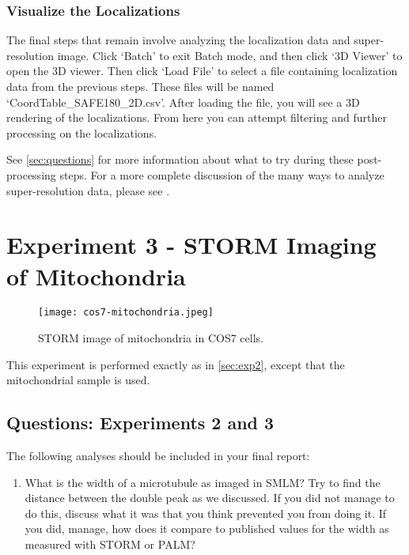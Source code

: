 \documentclass[10pt,a4paper,oneside]{book}
\begin{document}
\subsubsection{Visualize the Localizations}

The final steps that remain involve analyzing the localization data and super-resolution image. Click `Batch' to exit Batch mode, and then click `3D Viewer' to open the 3D viewer. Then click `Load File' to select a file containing localization data from the previous steps. These files will be named `CoordTable\_SAFE180\_2D.csv'. After loading the file, you will see a 3D rendering of the localizations. From here you can attempt filtering and further processing on the localizations.

See \autoref{sec:questions} for more information about what to try during these post-processing steps. For a more complete discussion of the many ways to analyze super-resolution data, please see \cite{martens-frontiersinbioinformatics-2022}.

\section{Experiment 3 - STORM Imaging of Mitochondria}\label{sec:exp3}

\begin{figure}[ht]
    \centering
    \texttt{[image: cos7-mitochondria.jpeg]}
    \caption{STORM image of mitochondria in COS7 cells.}
    \label{fig:cos7-mitochondria}
\end{figure}

This experiment is performed exactly as in \autoref{sec:exp2}, except that the mitochondrial sample is used.

\subsection{Questions: Experiments 2 and 3}\label{sec:questions}

The following analyses should be included in your final report:

\begin{enumerate}
    \item What is the width of a microtubule as imaged in SMLM? Try to find the distance between the double peak as we discussed. If you did not manage to do this, discuss what it was that you think prevented you from doing it. If you did, manage, how does it compare to published values for the width as measured with STORM or PALM?
\end{enumerate}
\end{document}
